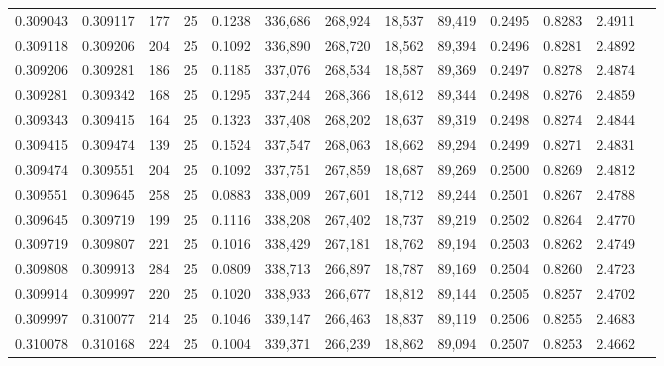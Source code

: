 \begin{tabular}{rrrrrrrrrrrrr}
0.309043 & 0.309117 &   177 &  25 &                                     0.1238 & 336,686 & 268,924 &  18,537 &  89,419 & 0.2495 & 0.8283 & 2.4911 \\
0.309118 & 0.309206 &   204 &  25 &                                     0.1092 & 336,890 & 268,720 &  18,562 &  89,394 & 0.2496 & 0.8281 & 2.4892 \\
0.309206 & 0.309281 &   186 &  25 &                                     0.1185 & 337,076 & 268,534 &  18,587 &  89,369 & 0.2497 & 0.8278 & 2.4874 \\
0.309281 & 0.309342 &   168 &  25 &                                     0.1295 & 337,244 & 268,366 &  18,612 &  89,344 & 0.2498 & 0.8276 & 2.4859 \\
0.309343 & 0.309415 &   164 &  25 &                                     0.1323 & 337,408 & 268,202 &  18,637 &  89,319 & 0.2498 & 0.8274 & 2.4844 \\
0.309415 & 0.309474 &   139 &  25 &                                     0.1524 & 337,547 & 268,063 &  18,662 &  89,294 & 0.2499 & 0.8271 & 2.4831 \\
0.309474 & 0.309551 &   204 &  25 &                                     0.1092 & 337,751 & 267,859 &  18,687 &  89,269 & 0.2500 & 0.8269 & 2.4812 \\
0.309551 & 0.309645 &   258 &  25 &                                     0.0883 & 338,009 & 267,601 &  18,712 &  89,244 & 0.2501 & 0.8267 & 2.4788 \\
0.309645 & 0.309719 &   199 &  25 &                                     0.1116 & 338,208 & 267,402 &  18,737 &  89,219 & 0.2502 & 0.8264 & 2.4770 \\
0.309719 & 0.309807 &   221 &  25 &                                     0.1016 & 338,429 & 267,181 &  18,762 &  89,194 & 0.2503 & 0.8262 & 2.4749 \\
0.309808 & 0.309913 &   284 &  25 &                                     0.0809 & 338,713 & 266,897 &  18,787 &  89,169 & 0.2504 & 0.8260 & 2.4723 \\
0.309914 & 0.309997 &   220 &  25 &                                     0.1020 & 338,933 & 266,677 &  18,812 &  89,144 & 0.2505 & 0.8257 & 2.4702 \\
0.309997 & 0.310077 &   214 &  25 &                                     0.1046 & 339,147 & 266,463 &  18,837 &  89,119 & 0.2506 & 0.8255 & 2.4683 \\
0.310078 & 0.310168 &   224 &  25 &                                     0.1004 & 339,371 & 266,239 &  18,862 &  89,094 & 0.2507 & 0.8253 & 2.4662 \\

\end{tabular}
